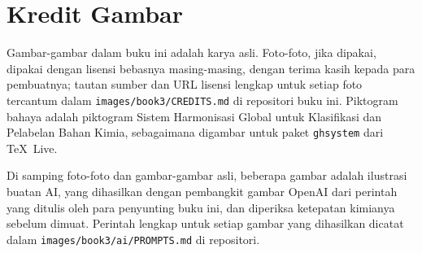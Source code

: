 \chapter*{Kredit Gambar}

Gambar-gambar dalam buku ini adalah karya asli. Foto-foto, jika dipakai,
dipakai dengan lisensi bebasnya masing-masing, dengan terima kasih kepada
para pembuatnya; tautan sumber dan URL lisensi lengkap untuk setiap foto
tercantum dalam \texttt{images/book3/CREDITS.md} di repositori buku ini.
Piktogram bahaya adalah piktogram Sistem Harmonisasi Global untuk
Klasifikasi dan Pelabelan Bahan Kimia, sebagaimana digambar untuk paket
\texttt{ghsystem} dari \TeX\ Live.

\bigskip
Di samping foto-foto dan gambar-gambar asli, beberapa gambar adalah
ilustrasi buatan AI, yang dihasilkan dengan pembangkit gambar OpenAI dari
perintah yang ditulis oleh para penyunting buku ini, dan diperiksa
ketepatan kimianya sebelum dimuat. Perintah lengkap untuk setiap gambar
yang dihasilkan dicatat dalam \texttt{images/book3/ai/PROMPTS.md} di
repositori.

